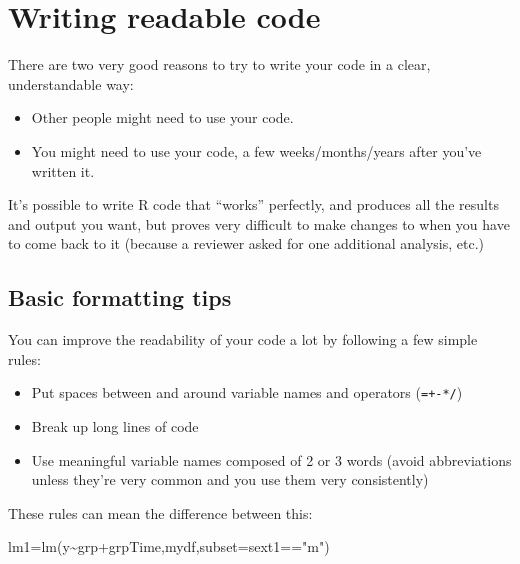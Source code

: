 \documentclass[
]{book}
\newenvironment{Shaded}{\begin{snugshade}}{\end{snugshade}}
\newcommand{\AttributeTok}[1]{\textcolor[rgb]{0.77,0.63,0.00}{#1}}
\newcommand{\FunctionTok}[1]{\textcolor[rgb]{0.00,0.00,0.00}{#1}}
\newcommand{\NormalTok}[1]{#1}
\newcommand{\OtherTok}[1]{\textcolor[rgb]{0.56,0.35,0.01}{#1}}
\newcommand{\SpecialCharTok}[1]{\textcolor[rgb]{0.00,0.00,0.00}{#1}}
\newcommand{\StringTok}[1]{\textcolor[rgb]{0.31,0.60,0.02}{#1}}
\providecommand{\tightlist}{%
  \setlength{\itemsep}{0pt}\setlength{\parskip}{0pt}}
\begin{document}
\hypertarget{writing-readable-code}{%
\section{Writing readable code}\label{writing-readable-code}}

There are two very good reasons to try to write your code in
a clear, understandable way:

\begin{itemize}
\tightlist
\item
  Other people might need to use your code.
\item
  You might need to use your code, a few weeks/months/years
  after you've written it.
\end{itemize}

It's possible to write R code that ``works'' perfectly, and
produces all the results and output you want, but proves
very difficult to make changes to when you have to come back
to it (because a reviewer asked for one additional analysis, etc.)

\hypertarget{basic-formatting-tips}{%
\subsection{Basic formatting tips}\label{basic-formatting-tips}}

You can improve the readability of your code a lot by following
a few simple rules:

\begin{itemize}
\tightlist
\item
  Put spaces between and around variable names and operators (\texttt{=+-*/})
\item
  Break up long lines of code
\item
  Use meaningful variable names composed of 2 or 3 words (avoid abbreviations
  unless they're very common and you use them very consistently)
\end{itemize}

These rules can mean the difference between this:

\begin{Shaded}
\begin{Highlighting}[]
\NormalTok{lm1}\OtherTok{=}\FunctionTok{lm}\NormalTok{(y}\SpecialCharTok{\textasciitilde{}}\NormalTok{grp}\SpecialCharTok{+}\NormalTok{grpTime,mydf,}\AttributeTok{subset=}\NormalTok{sext1}\SpecialCharTok{==}\StringTok{"m"}\NormalTok{)}
\end{Highlighting}
\end{Shaded}
\end{document}
